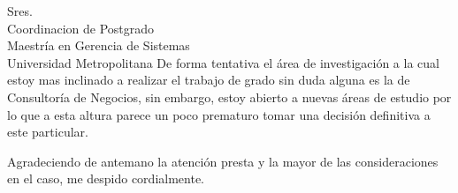 \documentclass[12pt, a4paper]{letter} %
\begin{document}
\begin{letter}{
	Sres.\\
	Coordinacion de Postgrado \\
	Maestría en Gerencia de Sistemas\\
	Universidad Metropolitana
}
	De forma tentativa el área de investigación a la cual estoy mas inclinado a realizar el trabajo de grado sin duda alguna es la de Consultoría de Negocios, sin embargo, estoy abierto a nuevas áreas de estudio por lo que a esta altura parece un poco prematuro tomar una decisión definitiva a este particular. 
	
	Agradeciendo de antemano la atención presta y la mayor de las consideraciones en el caso, me despido cordialmente.
	
	\noindent {} 



\end{letter}
\end{document}
